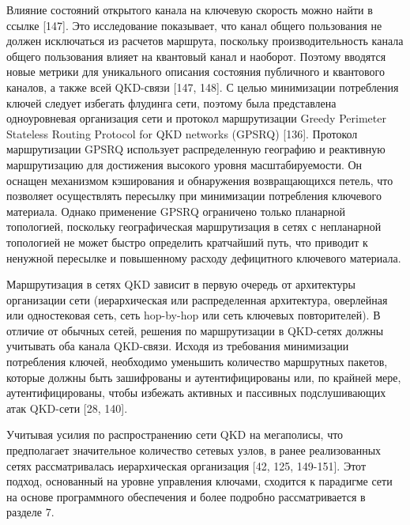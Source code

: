 Влияние состояний открытого канала на ключевую скорость можно найти в ссылке [147]. Это исследование показывает, что канал общего пользования не должен исключаться из расчетов маршрута, поскольку производительность канала общего пользования влияет на квантовый канал и наоборот. Поэтому вводятся новые метрики для уникального описания состояния публичного и квантового каналов, а также всей QKD-связи [147, 148]. С целью минимизации потребления ключей следует избегать флудинга сети, поэтому была представлена одноуровневая организация сети и протокол маршрутизации Greedy Perimeter Stateless Routing Protocol for QKD networks (GPSRQ) [136]. Протокол маршрутизации GPSRQ использует распределенную географию и реактивную маршрутизацию для достижения высокого уровня масштабируемости. Он оснащен механизмом кэширования и обнаружения возвращающихся петель, что позволяет осуществлять пересылку при минимизации потребления ключевого материала. Однако применение GPSRQ ограничено только планарной топологией, поскольку географическая маршрутизация в сетях с непланарной топологией не может быстро определить кратчайший путь, что приводит к ненужной пересылке и повышенному расходу дефицитного ключевого материала.

Маршрутизация в сетях QKD зависит в первую очередь от архитектуры организации сети (иерархическая или распределенная архитектура, оверлейная или одностековая сеть, сеть hop-by-hop или сеть ключевых повторителей). В отличие от обычных сетей, решения по маршрутизации в QKD-сетях должны учитывать оба канала QKD-связи. Исходя из требования минимизации потребления ключей, необходимо уменьшить количество маршрутных пакетов, которые должны быть зашифрованы и аутентифицированы или, по крайней мере, аутентифицированы, чтобы избежать активных и пассивных подслушивающих атак QKD-сети [28, 140].

Учитывая усилия по распространению сети QKD на мегаполисы, что предполагает значительное количество сетевых узлов, в ранее реализованных сетях рассматривалась иерархическая организация [42, 125, 149-151]. Этот подход, основанный на уровне управления ключами, сходится к парадигме сети на основе программного обеспечения и более подробно рассматривается в разделе 7.

